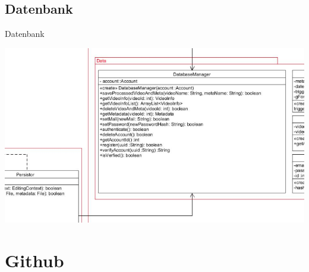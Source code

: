 \documentclass[19pt]{beamer}
\begin{document}
\subsection{Datenbank}
\begin{frame}{Datenbank}
\begin{center}
\includegraphics[scale=0.35]{resources/service_db.png}
\end{center}
\end{frame}


\section{Github}
\end{document}

